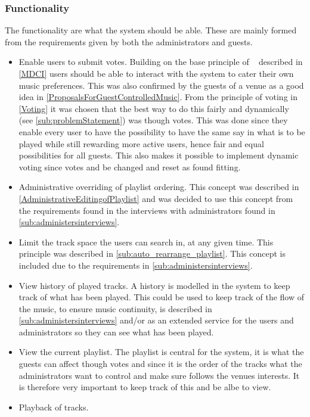 \subsubsection{Functionality}
The functionality are what the system should be able. These are mainly formed from the requirements given by both the administrators and guests.
\begin{itemize}
    \item Enable users to submit votes. Building on the base principle of ~\cite{sorensen2012} described in \cref{MDCI} users should be able to interact with the system to cater their own music preferences. This was also confirmed by the guests of a venue as a good idea in \cref{ProposalsForGuestControlledMusic}. From the principle of voting in \cref{Voting} it was chosen that the best way to do this fairly and dynamically (see \cref{sub:problemStatement}) was though votes. This was done since they enable every user to have the possibility to have the same say in what is to be played while still rewarding more active users, hence fair and equal possibilities for all guests. This also makes it possible to implement dynamic voting since votes and be changed and reset as found fitting.
    \item Administrative overriding of playlist ordering. This concept was described in \cref{AdministrativeEditingofPlaylist} and was decided to use this concept from the requirements found in the interviews with administrators found in \cref{sub:administersinterviews}.
    \item Limit the track space the users can search in, at any given time. This principle was described in \cref{sub:auto_rearrange_playlist}. This concept is included due to the requirements in \cref{sub:administersinterviews}.
    \item View history of played tracks. A history is modelled in the system to keep track of what has been played. This could be used to keep track of the flow of the music, to ensure music continuity, is described in \cref{sub:administersinterviews} and/or as an extended service for the users and administrators so they can see what has been played.
		\item View the current playlist. The playlist is central for the system, it is what the guests can affect though votes and since it is the order of the tracks what the administrators want to control and make sure follows the venues interests. It is therefore very important to keep track of this and be albe to view.
    \item Playback of tracks.
\end{itemize}

